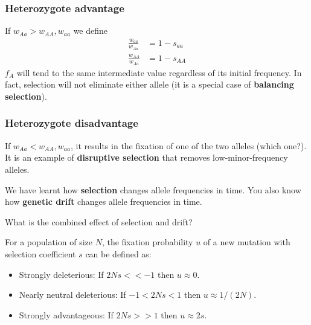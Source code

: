 \documentclass{beamer}
\newcommand{\1}{\ensuremath{\mathbf{1}}}
\begin{document}
%
%
%
\begin{frame}\frametitle{Heterozygote advantage}
	If $w_{Aa} > w_{AA}, w_{aa}$ we define
	\begin{equation}
		\begin{split}
			\tfrac{w_{aa}}{w_{Aa}} & = 1 - s_{aa}\\
			\tfrac{w_{AA}}{w_{Aa}} & = 1 - s_{AA}
		\end{split}
	\end{equation}
	$f_A$ will tend to the same intermediate value regardless of its initial frequency. In fact, selection will not eliminate either allele (it is a special case of \textbf{balancing selection}).
\end{frame}
%
%
%
\begin{frame}\frametitle{Heterozygote disadvantage}
	If $w_{Aa} < w_{AA}, w_{aa}$, it results in the fixation of one of the two alleles (which one?).\\[2ex]
	It is an example of \textbf{disruptive selection} that removes low-minor-frequency alleles.
\end{frame}
%
%
%
\begin{frame}
	We have learnt how \textbf{selection} changes allele frequencies in time. You also know how \textbf{genetic drift} changes allele frequencies in time.
	\begin{block}{}
		What is the combined effect of selection and drift?
	\end{block}
\end{frame}
%
%
%
\begin{frame}
	For a population of size $N$, the fixation probability $u$ of a new mutation with selection coefficient $s$ can be defined as:
	\begin{itemize}
		\item Strongly deleterious: If $2Ns << -1$ then $u \approx 0$.
		\item Nearly neutral deleterious: If $-1 < 2Ns < 1$ then $u \approx 1/(2N)$.
		\item Strongly advantageous: If $2Ns >> 1$ then $u \approx 2s$.
	\end{itemize}
\end{frame}
\end{document}
